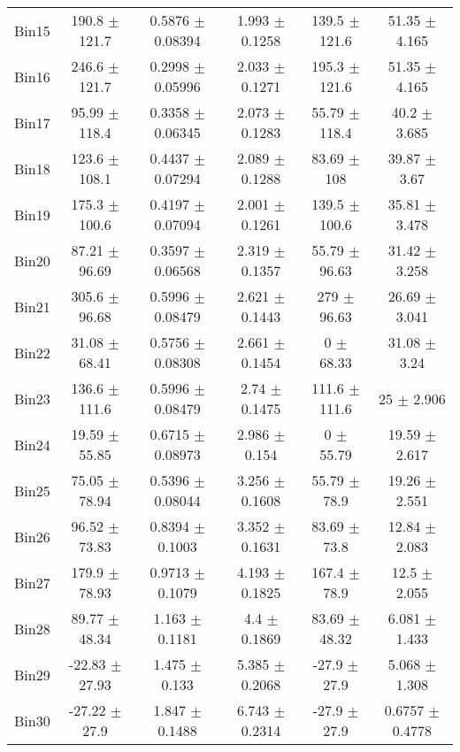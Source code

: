 \begin{tabular}{@{\extracolsep{4pt}}lccccc@{}}
     Bin15 & 190.8 $\pm$ 121.7 & 0.5876 $\pm$ 0.08394 & 1.993 $\pm$ 0.1258 & 139.5 $\pm$ 121.6 & 51.35 $\pm$ 4.165 \\ 
     Bin16 & 246.6 $\pm$ 121.7 & 0.2998 $\pm$ 0.05996 & 2.033 $\pm$ 0.1271 & 195.3 $\pm$ 121.6 & 51.35 $\pm$ 4.165 \\ 
     Bin17 & 95.99 $\pm$ 118.4 & 0.3358 $\pm$ 0.06345 & 2.073 $\pm$ 0.1283 & 55.79 $\pm$ 118.4 & 40.2 $\pm$ 3.685 \\ 
     Bin18 & 123.6 $\pm$ 108.1 & 0.4437 $\pm$ 0.07294 & 2.089 $\pm$ 0.1288 & 83.69 $\pm$ 108 & 39.87 $\pm$ 3.67 \\ 
     Bin19 & 175.3 $\pm$ 100.6 & 0.4197 $\pm$ 0.07094 & 2.001 $\pm$ 0.1261 & 139.5 $\pm$ 100.6 & 35.81 $\pm$ 3.478 \\ 
     Bin20 & 87.21 $\pm$ 96.69 & 0.3597 $\pm$ 0.06568 & 2.319 $\pm$ 0.1357 & 55.79 $\pm$ 96.63 & 31.42 $\pm$ 3.258 \\ 
     Bin21 & 305.6 $\pm$ 96.68 & 0.5996 $\pm$ 0.08479 & 2.621 $\pm$ 0.1443 & 279 $\pm$ 96.63 & 26.69 $\pm$ 3.041 \\ 
     Bin22 & 31.08 $\pm$ 68.41 & 0.5756 $\pm$ 0.08308 & 2.661 $\pm$ 0.1454 & 0 $\pm$ 68.33 & 31.08 $\pm$ 3.24 \\ 
     Bin23 & 136.6 $\pm$ 111.6 & 0.5996 $\pm$ 0.08479 & 2.74 $\pm$ 0.1475 & 111.6 $\pm$ 111.6 & 25 $\pm$ 2.906 \\ 
     Bin24 & 19.59 $\pm$ 55.85 & 0.6715 $\pm$ 0.08973 & 2.986 $\pm$ 0.154 & 0 $\pm$ 55.79 & 19.59 $\pm$ 2.617 \\ 
     Bin25 & 75.05 $\pm$ 78.94 & 0.5396 $\pm$ 0.08044 & 3.256 $\pm$ 0.1608 & 55.79 $\pm$ 78.9 & 19.26 $\pm$ 2.551 \\ 
     Bin26 & 96.52 $\pm$ 73.83 & 0.8394 $\pm$ 0.1003 & 3.352 $\pm$ 0.1631 & 83.69 $\pm$ 73.8 & 12.84 $\pm$ 2.083 \\ 
     Bin27 & 179.9 $\pm$ 78.93 & 0.9713 $\pm$ 0.1079 & 4.193 $\pm$ 0.1825 & 167.4 $\pm$ 78.9 & 12.5 $\pm$ 2.055 \\ 
     Bin28 & 89.77 $\pm$ 48.34 & 1.163 $\pm$ 0.1181 & 4.4 $\pm$ 0.1869 & 83.69 $\pm$ 48.32 & 6.081 $\pm$ 1.433 \\ 
     Bin29 & -22.83 $\pm$ 27.93 & 1.475 $\pm$ 0.133 & 5.385 $\pm$ 0.2068 & -27.9 $\pm$ 27.9 & 5.068 $\pm$ 1.308 \\ 
     Bin30 & -27.22 $\pm$ 27.9 & 1.847 $\pm$ 0.1488 & 6.743 $\pm$ 0.2314 & -27.9 $\pm$ 27.9 & 0.6757 $\pm$ 0.4778 \\ 
\hline\hline
  \end{tabular}
